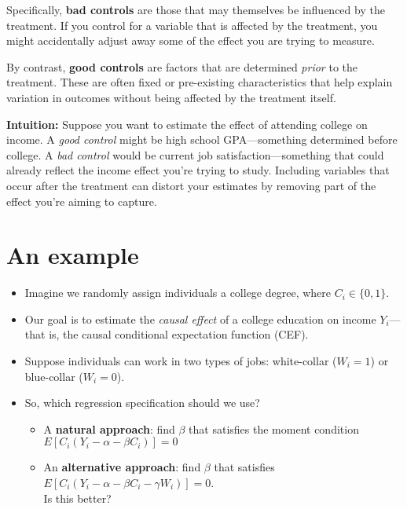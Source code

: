 \documentclass[12pt]{article}
\begin{document}
Specifically, \textbf{bad controls} are those that may themselves be influenced by the treatment. If you control for a variable that is affected by the treatment, you might accidentally adjust away some of the effect you are trying to measure.

By contrast, \textbf{good controls} are factors that are determined \textit{prior} to the treatment. These are often fixed or pre-existing characteristics that help explain variation in outcomes without being affected by the treatment itself.

\textbf{Intuition:} Suppose you want to estimate the effect of attending college on income. A \textit{good control} might be high school GPA—something determined before college. A \textit{bad control} would be current job satisfaction—something that could already reflect the income effect you're trying to study. Including variables that occur after the treatment can distort your estimates by removing part of the effect you're aiming to capture.

\section*{\noindent\textbf{An example}}

\begin{itemize}
  \item Imagine we randomly assign individuals a college degree, where $C_i \in \{0, 1\}$.
  
  \item Our goal is to estimate the \textit{causal effect} of a college education on income $Y_i$—that is, the causal conditional expectation function (CEF).
  
  \item Suppose individuals can work in two types of jobs: white-collar ($W_i = 1$) or blue-collar ($W_i = 0$).
  
  \item So, which regression specification should we use?
  \begin{itemize}
    \item A \textbf{natural approach}: find $\beta$ that satisfies the moment condition $E[C_i(Y_i - \alpha - \beta C_i)] = 0$
    
    \item An \textbf{alternative approach}: find $\beta$ that satisfies $E[C_i(Y_i - \alpha - \beta C_i - \gamma W_i)] = 0$.\\
    Is this better?
  \end{itemize}
\end{itemize}
\end{document}

